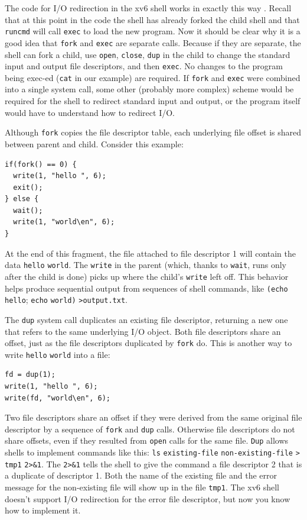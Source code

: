 The code for I/O redirection in the xv6 shell works in exactly this way
.
Recall that at this point in the code the shell has already forked the
child shell and that 
\lstinline{runcmd} 
will call
\lstinline{exec}
to load the new program.  Now it should be clear why it is a good idea that
\lstinline{fork}
and 
\lstinline{exec} 
are separate calls.  Because if they are separate, the shell can fork a child,
use
\lstinline{open},
\lstinline{close},
\lstinline{dup}
in the child to change the standard input and output
file descriptors, and then
\lstinline{exec}.
No changes to the program being exec-ed
(\lstinline{cat}
in our example)
are required.
If
\lstinline{fork}
and
\lstinline{exec}
were combined into a single
system call, some other (probably more complex) scheme would be required for the
shell to redirect standard input and output, or the program itself would have to
understand how to redirect I/O.

Although
\lstinline{fork}
copies the file descriptor table, each underlying file offset is shared
between parent and child.
Consider this example:
\begin{lstlisting}[]
if(fork() == 0) {
  write(1, "hello ", 6);
  exit();
} else {
  wait();
  write(1, "world\en", 6);
}
\end{lstlisting}
At the end of this fragment, the file attached to file descriptor 1
will contain the data
\lstinline{hello}
\lstinline{world}.
The
\lstinline{write}
in the parent
(which, thanks to
\lstinline{wait},
runs only after the child is done)
picks up where the child's
\lstinline{write}
left off.
This behavior helps produce sequential output from sequences
of shell commands, like
\lstinline{(echo}
\lstinline{hello};
\lstinline{echo}
\lstinline{world)}
\lstinline{>output.txt}.

The
\lstinline{dup}
system call duplicates an existing file descriptor,
returning a new one that refers to the same underlying I/O object.
Both file descriptors share an offset, just as the file descriptors
duplicated by
\lstinline{fork}
do.
This is another way to write
\lstinline{hello}
\lstinline{world}
into a file:
\begin{lstlisting}[]
fd = dup(1);
write(1, "hello ", 6);
write(fd, "world\en", 6);
\end{lstlisting}

Two file descriptors share an offset if they were derived from
the same original file descriptor by a sequence of
\lstinline{fork}
and
\lstinline{dup}
calls.
Otherwise file descriptors do not share offsets, even if they
resulted from 
\lstinline{open}
calls for the same file.  
\lstinline{Dup} 
allows shells to implement commands like this:
\lstinline{ls}
\lstinline{existing-file}
\lstinline{non-existing-file}
\lstinline{>}
\lstinline{tmp1}
\lstinline{2>&1}.
The
\lstinline{2>&1}
tells the shell to give the command a file descriptor 2 that
is a duplicate of descriptor 1.
Both the name of the existing file and the error message for the
non-existing file will show up in the file
\lstinline{tmp1}.
The xv6 shell doesn't support I/O redirection for the error file
descriptor, but now you know how to implement it.

